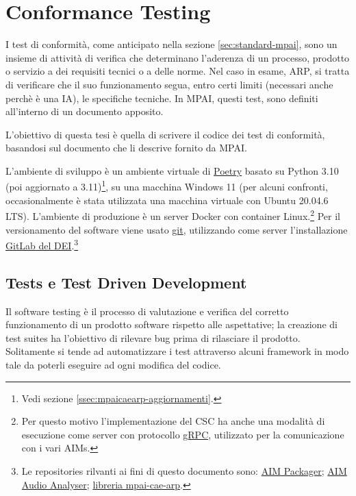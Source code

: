 
\chapter{Conformance Testing} \label{chp:conformancetesting}    %
I test di conformità, come anticipato nella sezione \ref{sec:standard-mpai}, sono un insieme di attività di verifica che determinano l'aderenza di un processo, prodotto o servizio a dei requisiti tecnici o a delle norme.
Nel caso in esame, \ac{ARP}, si tratta di verificare che il suo funzionamento segua, entro certi limiti (necessari anche perchè è una \ac{IA}), le specifiche tecniche. In \ac{MPAI}, questi test, sono definiti all'interno di un documento apposito.

L'obiettivo di questa tesi è quella di scrivere il codice dei test di conformità, basandosi sul documento che li descrive fornito da MPAI.

L'ambiente di sviluppo è un ambiente virtuale di \href{https://python-poetry.org/}{Poetry} basato su Python 3.10 (poi aggiornato a 3.11)\footnote{Vedi sezione \ref{ssec:mpaicaearp-aggiornamenti}.}, su una macchina Windows 11 (per alcuni confronti, occasionalmente è stata utilizzata una macchina virtuale con Ubuntu 20.04.6 LTS). L'ambiente di produzione è un server Docker con container Linux.\footnote{Per questo motivo l'implementazione del \ac{CSC} ha anche una modalità di esecuzione come server con protocollo \href{https://grpc.io/}{gRPC}, utilizzato per la comunicazione con i vari \acp{AIM}.} Per il versionamento del software viene usato \href{https://git-scm.com/}{git}, utilizzando come server l'installazione \href{https://gitlab.dei.unipd.it/}{GitLab del \ac{DEI}}.\footnote{Le repositories rilvanti ai fini di questo documento sono: \href{https://gitlab.dei.unipd.it/mpai/packager}{\ac{AIM} Packager}; \href{https://gitlab.dei.unipd.it/mpai/audio-analyzer}{\ac{AIM} Audio Analyser}; \href{https://gitlab.dei.unipd.it/mpai/mpai-cae-arp}{libreria mpai-cae-arp}.}


\section{Tests e Test Driven Development} \label{sec:tests-tdd}
Il software testing è il processo di valutazione e verifica del corretto funzionamento di un prodotto software rispetto alle aspettative; la creazione di test suites ha l'obiettivo di rilevare bug prima di rilasciare il prodotto.
Solitamente si tende ad automatizzare i test attraverso alcuni framework in modo tale da poterli eseguire ad ogni modifica del codice.


